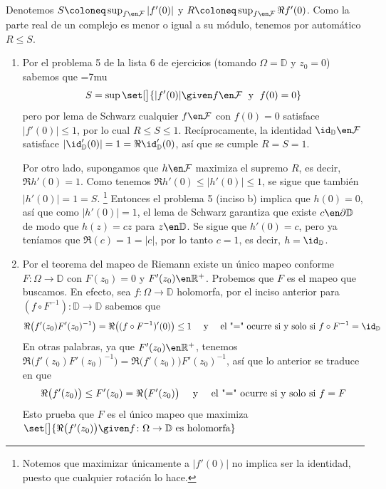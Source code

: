 \begin{sol}
Denotemos $S \coloneq \sup_{f\en \mathcal{F}}|f'(0)|$ y $R\coloneq \sup_{f\en \mathcal{F}} \Re f'(0)$. Como la parte real de un complejo es menor o igual a su módulo, tenemos por automático $R \le S$.
\begin{enumerate}[label=(\alph*),leftmargin=1.5em]
\item %
Por el problema 5 de la lista 6 de ejercicios (tomando $\Omega = \mathbb{D}$ y $z_0 = 0$) sabemos que 
{\thickmuskip=7mu
\[
S = \sup\set[\big]{|f'(0)| \given f \en \mathcal{F} \;\text{ y }\; f(0) = 0}
\]}%
pero por lema de Schwarz cualquier $f\en\mathcal{F}$ con $f(0) = 0$ satisface $|f'(0)| \le 1$, por lo cual $R \le S \le 1$. Recíprocamente, la identidad $\id_\mathbb{D} \en \mathcal{F}$ satisface $|\id'_{\mathbb{D}}(0)| = 1 = \Re\id'_{\mathbb{D}}(0)$, así que se cumple $R=S=1$.\par
Por otro lado, supongamos que $h\en\mathcal{F}$ maximiza el supremo $R$, es decir, $\Re h'(0) = 1$. Como tenemos $\Re h'(0) \leq |h'(0)| \leq 1$, se sigue que también $|h'(0)| = 1 = S$.%
\footnote{
    Notemos que maximizar únicamente a $|f'(0)|$ no implica ser la identidad, puesto que cualquier rotación lo hace.
}
Entonces el problema 5 (inciso b) implica que $h(0) = 0$, así que como $|h'(0)| = 1$, el lema de Schwarz garantiza que existe $c\en \partial\mathbb{D}$ de modo que $h(z) = c z$ para $z\en\mathbb{D}$. Se sigue que $h'(0) = c$, pero ya teníamos que $\Re(c) = 1 = |c|$, por lo tanto $c=1$, es decir, $h= \id_{\mathbb{D}}$.
\item %
Por el teorema del mapeo de Riemann existe un único mapeo conforme $F \colon \Omega \to \mathbb{D}$ con $F(z_0) = 0$ y $F'(z_0)\en\mathbb{R}^+$. Probemos que $F$ es el mapeo que buscamos. En efecto, sea $f\colon\Omega \to \mathbb{D}$ holomorfa, por el inciso anterior para $(f\circ F^{-1}) \colon \mathbb{D} \to \mathbb{D}$ sabemos que
\[
\Re\bigl({ f'(z_0)F'(z_0)^{-1} }\bigr)
= \Re\bigl({(f\circ F^{-1})'(0)}\bigr)
\leq 1
\text{ \quad y \quad el "=" ocurre si y solo si $f\circ F^{-1} = \id_{\mathbb{D}}$}
\]
En otras palabras, ya que $F'(z_0) \en \mathbb{R}^+$, tenemos $\Re\bigl({ f'(z_0)F'(z_0)^{-1} }\bigr) = \Re\bigl(f'(z_0)\bigr)F'(z_0)^{-1}$, así que lo anterior se traduce en que
\[
\Re\bigl(f'(z_0)\bigr) \leq F'(z_0) = \Re\bigl(F'(z_0)\bigr)
\text{ \quad y \quad el "=" ocurre si y solo si $f = F$}
\]
Esto prueba que $F$ es el único mapeo que maximiza $\set[\big]{ \Re\bigl(f'(z_0)\bigr) \given f\colon \Omega \to \mathbb{D} \text{ es holomorfa} }$
\end{enumerate}
\end{sol}